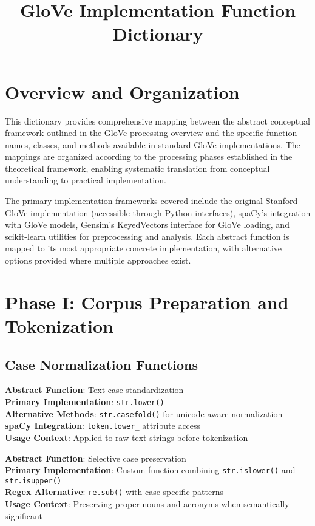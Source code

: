 \documentclass[11pt,a4paper]{article}
\title{GloVe Implementation Function Dictionary}
\author{}
\date{}
\begin{document}
\maketitle

\section{Overview and Organization}

This dictionary provides comprehensive mapping between the abstract conceptual framework outlined in the GloVe processing overview and the specific function names, classes, and methods available in standard GloVe implementations. The mappings are organized according to the processing phases established in the theoretical framework, enabling systematic translation from conceptual understanding to practical implementation.

The primary implementation frameworks covered include the original Stanford GloVe implementation (accessible through Python interfaces), spaCy's integration with GloVe models, Gensim's KeyedVectors interface for GloVe loading, and scikit-learn utilities for preprocessing and analysis. Each abstract function is mapped to its most appropriate concrete implementation, with alternative options provided where multiple approaches exist.

\section{Phase I: Corpus Preparation and Tokenization}

\subsection{Case Normalization Functions}

\textbf{Abstract Function}: Text case standardization \\
\textbf{Primary Implementation}: \texttt{str.lower()} \\
\textbf{Alternative Methods}: \texttt{str.casefold()} for unicode-aware normalization \\
\textbf{spaCy Integration}: \texttt{token.lower\_} attribute access \\
\textbf{Usage Context}: Applied to raw text strings before tokenization

\textbf{Abstract Function}: Selective case preservation \\
\textbf{Primary Implementation}: Custom function combining \texttt{str.islower()} and \texttt{str.isupper()} \\
\textbf{Regex Alternative}: \texttt{re.sub()} with case-specific patterns \\
\textbf{Usage Context}: Preserving proper nouns and acronyms when semantically significant
\end{document}
